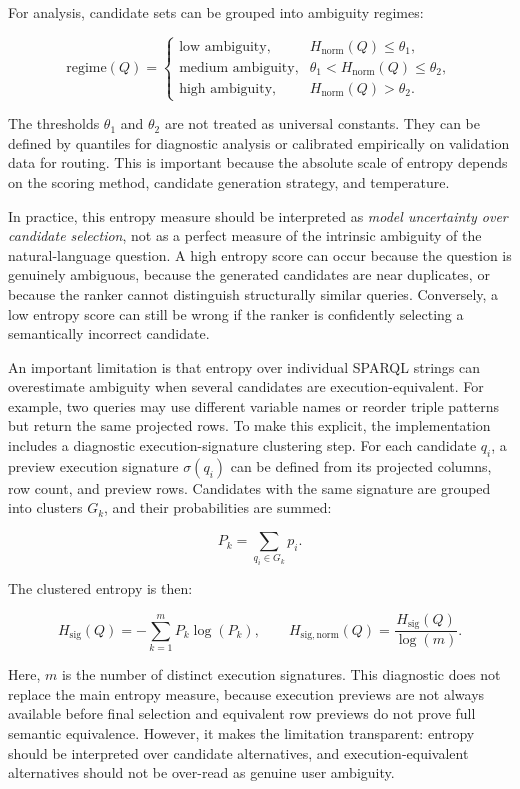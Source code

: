 \documentclass[
  12pt,
  english,
  oneside]{report}
\begin{document}
For analysis, candidate sets can be grouped into ambiguity regimes:

\[
\text{regime}(Q) =
\begin{cases}
\text{low ambiguity}, & H_{\mathrm{norm}}(Q) \leq \theta_1, \\
\text{medium ambiguity}, & \theta_1 < H_{\mathrm{norm}}(Q) \leq \theta_2, \\
\text{high ambiguity}, & H_{\mathrm{norm}}(Q) > \theta_2.
\end{cases}
\]

The thresholds \(\theta_1\) and \(\theta_2\) are not treated as universal constants. They can be defined by quantiles for diagnostic analysis or calibrated empirically on validation data for routing. This is important because the absolute scale of entropy depends on the scoring method, candidate generation strategy, and temperature.

In practice, this entropy measure should be interpreted as \emph{model uncertainty over candidate selection}, not as a perfect measure of the intrinsic ambiguity of the natural-language question. A high entropy score can occur because the question is genuinely ambiguous, because the generated candidates are near duplicates, or because the ranker cannot distinguish structurally similar queries. Conversely, a low entropy score can still be wrong if the ranker is confidently selecting a semantically incorrect candidate.

An important limitation is that entropy over individual SPARQL strings can overestimate ambiguity when several candidates are execution-equivalent. For example, two queries may use different variable names or reorder triple patterns but return the same projected rows. To make this explicit, the implementation includes a diagnostic execution-signature clustering step. For each candidate \(q_i\), a preview execution signature \(\sigma(q_i)\) can be defined from its projected columns, row count, and preview rows. Candidates with the same signature are grouped into clusters \(G_k\), and their probabilities are summed:

\[
P_k = \sum_{q_i \in G_k} p_i.
\]

The clustered entropy is then:

\[
H_{\mathrm{sig}}(Q) =
- \sum_{k=1}^{m} P_k \log(P_k),
\qquad
H_{\mathrm{sig,norm}}(Q) =
\frac{H_{\mathrm{sig}}(Q)}{\log(m)}.
\]

Here, \(m\) is the number of distinct execution signatures. This diagnostic does not replace the main entropy measure, because execution previews are not always available before final selection and equivalent row previews do not prove full semantic equivalence. However, it makes the limitation transparent: entropy should be interpreted over candidate alternatives, and execution-equivalent alternatives should not be over-read as genuine user ambiguity.
\end{document}
